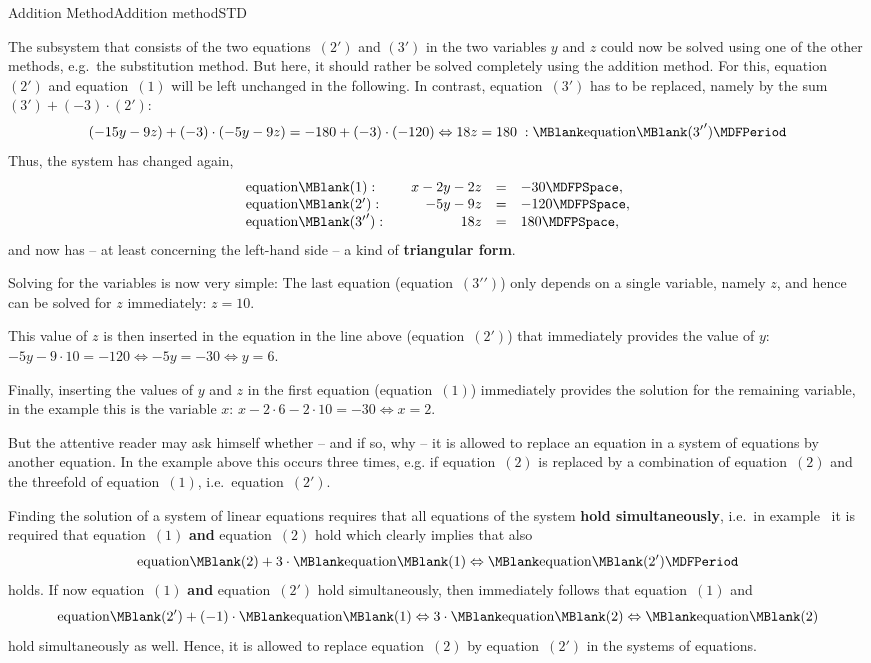 \begin{MXContent}{Addition Method}{Addition method}{STD}
\begin{MExample}
The subsystem that consists of the two equations~$(2')$ and $(3')$ in the two variables 
$y$ and $z$ could now be solved using one of the other methods, e.g.\ the substitution
method. But here, it should rather be solved completely using the addition method. For this, 
equation~$(2')$ and equation~$(1)$ will be left unchanged in the following. In contrast,
equation~$(3')$ has to be replaced, namely by the sum $(3') + (- 3) \cdot (2')$:
$$(- 15 y - 9 z) + (- 3) \cdot (- 5 y - 9 z) = - 180 + (- 3) \cdot (- 120) \Leftrightarrow
18 z = 180 \; : \MBlank\mbox{equation}\MBlank ({3'}') \MDFPeriod $$
Thus, the system has changed again,
$$\begin{array}{lcrcl} \mbox{equation}\MBlank (1): & & x - 2 y - 2 z & = & - 30 \MDFPSpace, \\
\mbox{equation}\MBlank (2'): & & - 5 y - 9 z & = & - 120 \MDFPSpace, \\
\mbox{equation}\MBlank ({3'}'): & & 18 z & = &  180 \MDFPSpace, \end{array}$$
and now has -- at least concerning the left-hand side -- a kind of \textbf{triangular form}.

Solving for the variables is now very simple: The last equation (equation~$({3'}')$)
only depends on a single variable, namely $z$, and hence can be solved for $z$ immediately: 
$z = 10$. 

This value of $z$ is then inserted in the equation in the line above (equation~$(2')$)
that immediately provides the value of $y$: 
$- 5 y - 9 \cdot 10 = - 120 \Leftrightarrow - 5 y = - 30 \Leftrightarrow y = 6$. 

Finally, inserting the values  of $y$ and $z$ in the first equation (equation~$(1)$)
immediately provides the solution for the remaining variable, in the example this is the 
variable $x$: $x - 2 \cdot 6 - 2 \cdot 10 = - 30 \Leftrightarrow x = 2$.
\end{MExample}

But the attentive reader may ask himself whether -- and if so, why -- it is allowed 
to replace an equation in a system of equations by another equation. In the example
above this occurs three times, e.g. if equation~$(2)$ is replaced by a combination
of equation~$(2)$ and the threefold of equation~$(1)$, i.e.\ equation~$(2')$.

Finding the solution of a system of linear equations requires that all equations 
of the system \textbf{hold simultaneously}, i.e.\ in example~
it is required that equation~$(1)$ \textbf{and} equation~$(2)$ hold which clearly implies
that also 
$$\mbox{equation}\MBlank (2) + 3 \cdot \MBlank\mbox{equation}\MBlank (1) 
\Leftrightarrow \MBlank\mbox{equation}\MBlank (2') \MDFPeriod $$
holds. If now equation~$(1)$ \textbf{and} equation~$(2')$ hold simultaneously, 
then immediately follows that equation~$(1)$ and
$$\mbox{equation}\MBlank (2') + (-1) \cdot \MBlank\mbox{equation}\MBlank (1) 
\Leftrightarrow 3\cdot\MBlank\mbox{equation}\MBlank (2) 
\Leftrightarrow \MBlank\mbox{equation}\MBlank (2)  $$
hold simultaneously as well. Hence, it is allowed to replace equation~$(2)$
by equation~$(2')$ in the systems of equations.


\end{MXContent}
